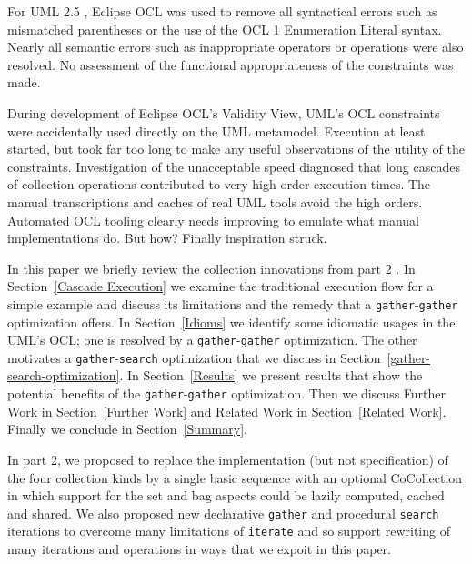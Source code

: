 \documentclass[
]{ceurart}
\begin{document}
For UML 2.5 \cite{UML-2.5}, Eclipse OCL \cite{Eclipse-OCL} was used to remove all syntactical errors such as mismatched parentheses or the use of the OCL 1 Enumeration Literal syntax. Nearly all semantic errors such as inappropriate operators or operations were also resolved. No assessment of the functional appropriateness of the constraints was made.

During development of Eclipse OCL's Validity View, UML's OCL constraints were accidentally used directly on the UML metamodel. Execution at least started, but took far too long to make any useful observations of the utility of the constraints. Investigation of the unacceptable speed diagnosed that long cascades of collection operations contributed to very high order execution times. The manual transcriptions and caches of real UML tools avoid the high orders. Automated OCL tooling clearly needs improving to emulate what manual implementations do. But how? Finally inspiration struck.

In this paper we briefly review the collection innovations from part 2 \cite{Willink-Collections2}. In Section~\ref{Cascade Execution} we examine the traditional execution flow for a simple example and discuss its limitations and the remedy that a \verb!gather!-\verb!gather! optimization offers. In Section~\ref{Idioms} we identify some idiomatic usages in the UML's OCL; one is resolved by a \verb!gather!-\verb!gather! optimization. The other motivates a \verb!gather!-\verb!search! optimization that we discuss in Section~\ref{gather-search-optimization}. In Section~\ref{Results} we present results that show the potential benefits of the  \verb!gather!-\verb!gather! optimization. Then we discuss Further Work in Section~\ref{Further Work} and Related Work in Section~\ref{Related Work}. Finally we conclude in Section~\ref{Summary}.

In part 2, we proposed to replace the implementation (but not specification) of the four collection kinds by a single basic sequence with an optional CoCollection in which support for the set and bag aspects could be lazily computed, cached and shared. We also proposed new declarative \verb!gather! and procedural \verb!search! iterations to overcome many limitations of \verb!iterate! and so support rewriting of many iterations and operations in ways that we expoit in this paper.

\end{document}

